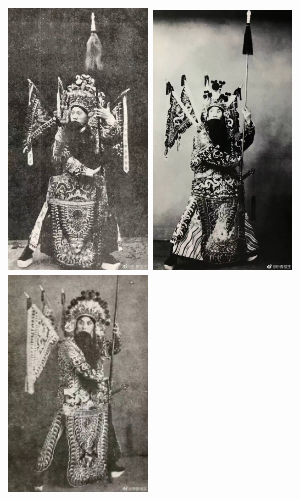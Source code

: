 \documentclass[cjk,slidestop,compress,mathserif,blue]{beamer}
\begin{document}
\frame
{
	\frametitle{}
\begin{figure}[h!]
\centering
\vspace{-0.15in}
\includegraphics[height=0.65\textwidth,width=0.33\textwidth,clip]{Figures_Peking-Opera/PekOpe_Liu-3.jpg}
\includegraphics[height=0.65\textwidth,width=0.33\textwidth,clip]{Figures_Peking-Opera/PekOpe_Liu-4.jpg}
\includegraphics[height=0.60\textwidth,width=0.33\textwidth,clip]{Figures_Peking-Opera/PekOpe_Liu-5.jpg}
\label{Liu_Zengfu-3}
\end{figure}
}
\end{document}
